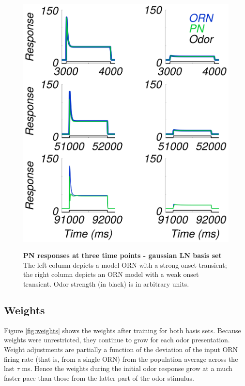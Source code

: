 \documentclass[a4paper,12pt,twoside]{article}
\begin{document}
\begin{figure}
\centering
\caption{\textbf{PN responses at three time points - gaussian LN basis set}  The left column depicts a model ORN with a strong onset transient; the right column depicts an ORN model with a weak onset transient.  Odor strength (in black) is in arbitrary units.}
\hspace*{-1.5cm}
\includegraphics[scale=0.7]{2016-09-01_PN_3timepoints.png}
\label{fig:pn2}
\end{figure}

\subsection{Weights}
Figure \ref{fig:weights} shows the weights after training for both basis sets.  Because weights were unrestricted, they continue to grow for each odor presentation.  Weight adjustments are partially a function of the deviation of the input ORN firing rate (that is, from a single ORN) from the population average across the last $\tau$ ms.  Hence the weights during the initial odor response grow at a much faster pace than those from the latter part of the odor stimulus.
\end{document}
